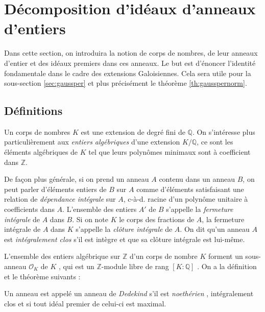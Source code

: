 \documentclass[a4paper]{article} %
\numberwithin{section}{part}
\numberwithin{equation}{section}
\newcommand\QQ{\mathbb{Q}}
\newcommand\ZZ{\mathbb{Z}}
\newcommand\EO{\mathcal{O}}
\begin{document}
\section{Décomposition d'idéaux d'anneaux d'entiers}
Dans cette section, on introduira la notion de corps de nombres, de leur
anneaux d'entier et des idéaux premiers dans ces anneaux. Le but est d'énoncer 
l'identité fondamentale dans le cadre des extensions Galoisiennes. Cela sera 
utile pour la sous-section \ref{sec:gaussper} et plus précisément le 
théorème \ref{th:gausspernorm}.

\subsection{Définitions}
Un corps de nombres $K$ est une extension de degré fini de $\QQ$. On s'intéresse
plus particulièrement aux \emph{entiers algébriques} d'une extension $K/\QQ$, ce
sont les éléments algébriques de $K$ tel que leurs polynômes minimaux sont à
coefficient dans $\ZZ$.\par 
De façon plus générale, si on prend un anneau $A$ contenu dans un anneau $B$, on
peut parler d'éléments entiers de $B$ sur $A$ comme d'éléments satisfaisant une 
relation de \emph{dépendance intégrale} sur $A$, c-à-d. racine d'un 
polynôme unitaire à coefficients dans $A$. L'ensemble des entiers $A'$ de $B$ 
s'appelle la \emph{fermeture intégrale} de $A$ dans $B$. Si on note $K$ le corps
des fractions de $A$, la fermeture intégrale de $A$ dans $K$ s'appelle la 
\emph{clôture intégrale} de $A$. On dit qu'un anneau $A$ est \emph{intégralement
clos} s'il est intègre et que sa clôture intégrale est lui-même.\par
L'ensemble des entiers algébrique sur $\ZZ$ d'un corps de nombre $K$ forment un
sous-anneau $\EO_K$ de $K$ \cite[p.~35, cor. 2]{Sam}, qui est un $\ZZ$-module 
libre de rang $[K:\QQ]$ \cite[p.~48, cor.]{Sam}. On a la définition et le 
théorème suivants :
\begin{defn}
Un anneau est appelé un anneau de \emph{Dedekind} s'il est \emph{noethérien} 
\cite[p.~55, déf. 1]{Sam}, intégralement clos et si tout idéal premier 
de celui-ci est maximal.
\end{defn}
\end{document}
